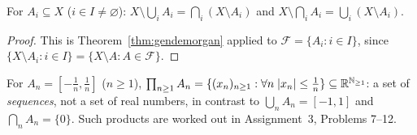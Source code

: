 \begin{theorem}\label{thm:indexedDM}
	For $A_i\subseteq X$ ($i\in I\ne\varnothing$): $X\setminus\bigcup_iA_i=\bigcap_i(X\setminus A_i)$ and $X\setminus\bigcap_iA_i=\bigcup_i(X\setminus A_i)$.
\end{theorem}
\begin{proof}
	This is Theorem~\ref{thm:gendemorgan} applied to $\mathcal F=\{A_i:i\in I\}$, since $\{X\setminus A_i:i\in I\}=\{X\setminus A:A\in\mathcal F\}$.
\end{proof}

\begin{example}
	For $A_n=[-\tfrac1n,\tfrac1n]$ ($n\ge1$), $\prod_{n\ge1}A_n=\{(x_n)_{n\ge1}:\forall n\;|x_n|\le\tfrac1n\}\subseteq\mathbb{R}^{\mathbb{N}_{\ge1}}$: a set of \emph{sequences}, not a set of real numbers, in contrast to $\bigcup_nA_n=[-1,1]$ and $\bigcap_nA_n=\{0\}$. Such products are worked out in Assignment~3, Problems 7--12.
\end{example}